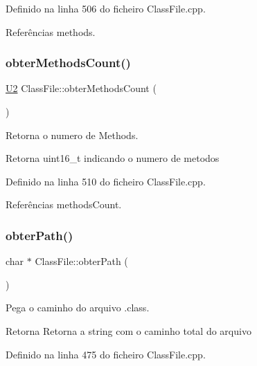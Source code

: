 Definido na linha 506 do ficheiro Class\+File.\+cpp.



Referências methods.

\mbox{\label{classClassFile_a16409bc8b58eb4965a1e39497cc300d8}} 
\subsubsection{\texorpdfstring{obter\+Methods\+Count()}{obterMethodsCount()}}
{\footnotesize\ttfamily \hyperlink{BasicTypes_8h_a90240657108b1b457eef9d3f76e0202e}{U2} Class\+File\+::obter\+Methods\+Count (\begin{DoxyParamCaption}{ }\end{DoxyParamCaption})}



Retorna o numero de Methods. 

\begin{DoxyReturn}{Retorna}
uint16\+\_\+t indicando o numero de metodos 
\end{DoxyReturn}


Definido na linha 510 do ficheiro Class\+File.\+cpp.



Referências methods\+Count.

\mbox{\label{classClassFile_a4803bd3f325fbab1bf9c0f774b3a8c97}} 
\subsubsection{\texorpdfstring{obter\+Path()}{obterPath()}}
{\footnotesize\ttfamily char $\ast$ Class\+File\+::obter\+Path (\begin{DoxyParamCaption}{ }\end{DoxyParamCaption})}



Pega o caminho do arquivo .class. 

\begin{DoxyReturn}{Retorna}
Retorna a string com o caminho total do arquivo 
\end{DoxyReturn}


Definido na linha 475 do ficheiro Class\+File.\+cpp.



